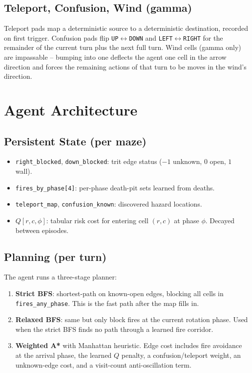 \documentclass[11pt]{article}
\begin{document}
\subsection{Teleport, Confusion, Wind (gamma)}
Teleport pads map a deterministic source to a deterministic destination,
recorded on first trigger.  Confusion pads flip
\texttt{UP}$\leftrightarrow$\texttt{DOWN} and
\texttt{LEFT}$\leftrightarrow$\texttt{RIGHT} for the remainder of the
current turn plus the next full turn.  Wind cells
(gamma only) are impassable -- bumping into one deflects the agent
one cell in the arrow direction and forces the remaining actions of
that turn to be moves in the wind's direction.

\section{Agent Architecture}

\subsection{Persistent State (per maze)}
\begin{itemize}[itemsep=0.2em]
  \item \texttt{right\_blocked}, \texttt{down\_blocked}: trit edge
    status ($-1$ unknown, $0$ open, $1$ wall).
  \item \texttt{fires\_by\_phase[4]}: per-phase death-pit sets learned
    from deaths.
  \item \texttt{teleport\_map}, \texttt{confusion\_known}: discovered
    hazard locations.
  \item $Q[r,c,\phi]$: tabular risk cost for entering cell $(r,c)$ at
    phase $\phi$.  Decayed between episodes.
\end{itemize}

\subsection{Planning (per turn)}

The agent runs a three-stage planner:
\begin{enumerate}[itemsep=0.2em]
  \item \textbf{Strict BFS}: shortest-path on known-open edges, blocking
    all cells in \texttt{fires\_any\_phase}.  This is the fast path
    after the map fills in.
  \item \textbf{Relaxed BFS}: same but only block fires at the current
    rotation phase.  Used when the strict BFS finds no path through a
    learned fire corridor.
  \item \textbf{Weighted A*} with Manhattan heuristic.  Edge cost
    includes fire avoidance at the arrival phase, the learned $Q$
    penalty, a confusion/teleport weight, an unknown-edge cost, and a
    visit-count anti-oscillation term.
\end{enumerate}
\end{document}
